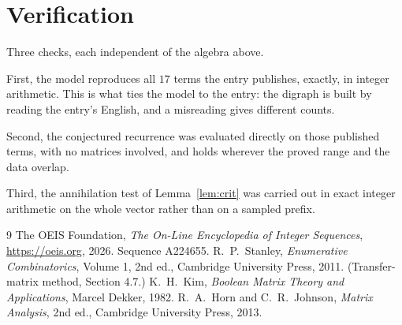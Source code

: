 \documentclass[11pt,a4paper]{article}
\theoremstyle{plain}
\theoremstyle{definition}
\begin{document}
\section{Verification}

Three checks, each independent of the algebra above.

First, the model reproduces all $17$ terms the entry publishes, exactly, in integer
arithmetic. This is what ties the model to the entry: the digraph is built by reading the
entry's English, and a misreading gives different counts.

Second, the conjectured recurrence was evaluated directly on those published terms, with no
matrices involved, and holds wherever the proved range and the data overlap.

Third, the annihilation test of Lemma~\ref{lem:crit} was carried out in exact integer
arithmetic on the whole vector rather than on a sampled prefix.

\begin{thebibliography}{9}
 The OEIS Foundation, \emph{The On-Line Encyclopedia of Integer
Sequences}, \url{https://oeis.org}, 2026. Sequence A224655.
 R.~P.~Stanley, \emph{Enumerative Combinatorics}, Volume 1, 2nd ed.,
Cambridge University Press, 2011. (Transfer-matrix method, Section 4.7.)
 K.~H.~Kim, \emph{Boolean Matrix Theory and Applications}, Marcel Dekker,
1982.
 R.~A.~Horn and C.~R.~Johnson, \emph{Matrix Analysis}, 2nd ed., Cambridge
University Press, 2013.
\end{thebibliography}
\end{document}
